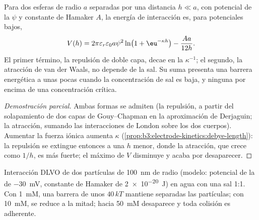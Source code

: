 \begin{theorem}\label{thm:b3:colloids:dlvo}
Para dos esferas de radio $a$ separadas por una distancia $h \ll a$, con potencial de la 
$\psi$ y constante de Hamaker $A$, la energía de interacción es, para potenciales bajos,
\[
  V(h) = 2\pi\varepsilon_r\varepsilon_0a\psi^2\ln\bigl(1 + \eu^{-\kappa h}\bigr) - \frac{Aa}{12h} .
\]
El primer término, la repulsión de doble capa, decae en la  $\kappa^{-1}$;
el segundo, la atracción de van der Waals, no depende de la sal. Su suma
presenta una barrera energética a unas pocas  cuando la concentración de sal es
baja, y ninguna por encima de una concentración crítica.
\end{theorem}

\begin{proof}[Demostración parcial]
Ambas formas se admiten (la repulsión, a partir del solapamiento de dos capas de
Gouy--Chapman en la aproximación de Derjaguin; la atracción, sumando las interacciones de London
sobre los dos cuerpos). Aumentar la fuerza iónica aumenta $\kappa$
(\cref{prop:b3:electrode-kinetics:debye-length}): la repulsión se extingue entonces a una
$h$ menor, donde la atracción, que crece como $1/h$, es más fuerte; el máximo
de $V$ disminuye y acaba por desaparecer.
\end{proof}

\begin{omfigure}

{\small Interacción DLVO de dos partículas de \qty{100}{nm} de radio (modelo: potencial de la  de \qty{-30}{mV}, constante de Hamaker de \qty{2e-20}{J}) en agua con una sal 1:1. Con \qty{1}{mM},
una barrera de unos $40\,kT$ mantiene separadas las partículas; con \qty{10}{mM}, se reduce a la mitad;
hacia \qty{50}{mM} desaparece y toda colisión es adherente.}
\end{omfigure}

